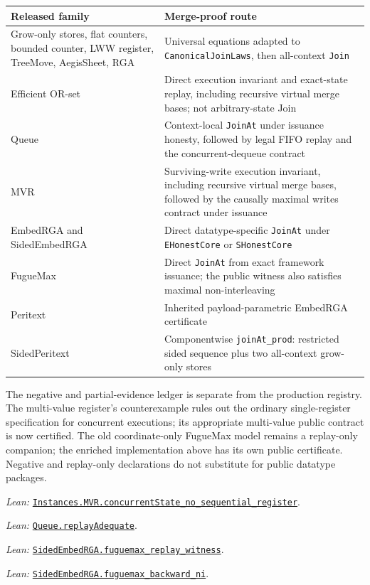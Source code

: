 \documentclass[11pt]{article}
\theoremstyle{definition}
\newcommand{\lean}[1]{\texttt{#1}}
\newcommand{\src}[2]{\href{../../#1}{\texttt{#2}}}
\newcommand{\anchor}[2]{\par\smallskip\noindent\emph{Lean: }\src{#1}{#2}.}
\begin{document}
\begin{longtable}{@{}>{\raggedright\arraybackslash}p{}
  >{\raggedright\arraybackslash}p{}@{}}
\toprule
Released family & Merge-proof route\\
\midrule
\endhead
Grow-only stores, flat counters, bounded counter, LWW register, TreeMove,
AegisSheet, RGA & Universal equations adapted to
\lean{CanonicalJoinLaws}, then all-context \lean{Join}\\
Efficient OR-set & Direct execution invariant and exact-state replay, including
recursive virtual merge bases; not arbitrary-state Join\\
Queue & Context-local \lean{JoinAt} under issuance honesty, followed by legal
FIFO replay and the concurrent-dequeue contract\\
MVR & Surviving-write execution invariant, including recursive virtual merge
bases, followed by the causally maximal writes contract under issuance\\
EmbedRGA and SidedEmbedRGA & Direct datatype-specific \lean{JoinAt} under
\lean{EHonestCore} or \lean{SHonestCore}\\
FugueMax & Direct \lean{JoinAt} from exact framework issuance; the public
witness also satisfies maximal non-interleaving\\
Peritext & Inherited payload-parametric EmbedRGA certificate\\
SidedPeritext & Componentwise \lean{joinAt\_prod}: restricted sided sequence
plus two all-context grow-only stores\\
\bottomrule
\end{longtable}

The negative and partial-evidence ledger is separate from the production
registry. The multi-value register's counterexample rules out the ordinary
single-register specification for concurrent executions; its appropriate
multi-value public contract is now certified. The old coordinate-only FugueMax
model remains a replay-only companion; the enriched implementation above has
its own public certificate. Negative and replay-only declarations do not
substitute for public datatype packages.
\anchor{Sal/MRDTs/Metatheory/NegativeLedger.lean}
  {Instances.MVR.concurrentState\_no\_sequential\_register}
\anchor{Sal/MRDTs/Instances/QueueCertificates.lean}
  {Queue.replayAdequate}
\anchor{Sal/MRDTs/Instances/FugueMaxReplay.lean}
  {SidedEmbedRGA.fuguemax\_replay\_witness}
\anchor{Sal/MRDTs/Instances/FugueMaxBackward.lean}
  {SidedEmbedRGA.fuguemax\_backward\_ni}
\end{document}
